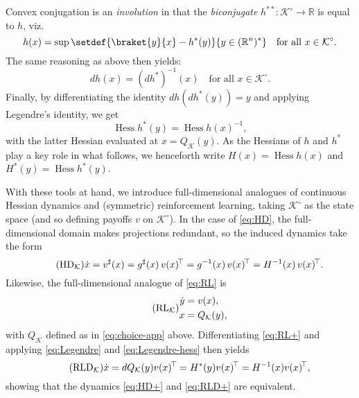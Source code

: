 \documentclass[reqno]{amsart}
\theoremstyle{plain}
\theoremstyle{definition}
\theoremstyle{remark}
\numberwithin{equation}{section}
\numberwithin{theorem}{section}
\begin{document}
Convex conjugation is an \emph{involution} in that the  \emph{biconjugate} $h^{\ast\ast}{\colon}{{\mathcal{K}}^{\circ}}\to{\mathbb{R}}$ is equal to $h$, viz.
\begin{equation}
\label{eq:biconjugate}
h(x)
	= \sup \setdef{\braket{y}{x} - h^{\ast}(y)}{y\in{({\mathbb{R}}^{n})^{\ast}}}
	\quad
	\text{for all $x\in{{\mathcal{K}}^{\circ}}$}.
\end{equation}
The same reasoning as above then yields:
\begin{equation}
\label{eq:Legendre-conj}
dh(x)
	= (dh^{\ast})^{-1}(x)
	\quad
	\text{for all $x\in{{\mathcal{K}}^{\circ}}$}.
\end{equation}
Finally, by differentiating the identity $dh(dh^{\ast}(y)) = y$ and applying Legendre's identity, we get
\begin{equation}
\label{eq:Legendre-hess}
\operatorname{Hess} h^{\ast} (y)
	= \operatorname{Hess} h(x)^{-1},
\end{equation}
with the latter Hessian evaluated at $x={Q_{\mathcal{K}}}(y)$.
As the Hessians of $h$ and $h^{\ast}$ play a key role in what follows, we henceforth write ${H}(x)=\operatorname{Hess} h(x)$ and ${H}^{\ast}(y)=\operatorname{Hess} h^{\ast}(y)$.

With these tools at hand, we introduce full-dimensional analogues of continuous Hessian dynamics and (symmetric) reinforcement learning, taking ${{\mathcal{K}}^{\circ}}$ as the state space (and so defining payoffs ${v}$ on ${{\mathcal{K}}^{\circ}}$).
In the case of \eqref{eq:HD}, the full-dimensional domain makes projections redundant, so the induced dynamics take the form
\begin{equation}
\label{eq:HD+}
\tag{HD$_{\mathcal{K}}$}
\dot x
	={v}^{\sharp}(x)
	= g^{\sharp}(x) \, {v}(x)^{{\!\top}}
	=g^{-1}(x) \, {v}(x)^{{\!\top}}
	= {H}^{-1}(x) \, {v}(x)^{{\!\top}}.
\end{equation}
Likewise, the full-dimensional analogue of \eqref{eq:RL} is
\begin{equation}
\label{eq:RL+}
\tag{RL$_{\mathcal{K}}$}
\begin{aligned}
\dot y
	&= {v}(x),
	\\
x
	&= {Q_{\mathcal{K}}}(y),
\end{aligned}
\end{equation}
with ${Q_{\mathcal{K}}}$ defined as in \eqref{eq:choice-app} above.
Differentiating \eqref{eq:RL+} and applying \eqref{eq:Legendre} and \eqref{eq:Legendre-hess} then yields
\begin{equation}
\label{eq:RLD+}
\tag{RLD$_{\mathcal{K}}$}
\dot x
	= d{Q_{\mathcal{K}}}(y) {v}(x)^{{\!\top}}
	= {H}^{\ast}(y)  {v}(x)^{{\!\top}}
	= {H}^{-1}(x) {v}(x)^{{\!\top}},
\end{equation}
showing that the dynamics \eqref{eq:HD+} and \eqref{eq:RLD+} are equivalent.
\end{document}
